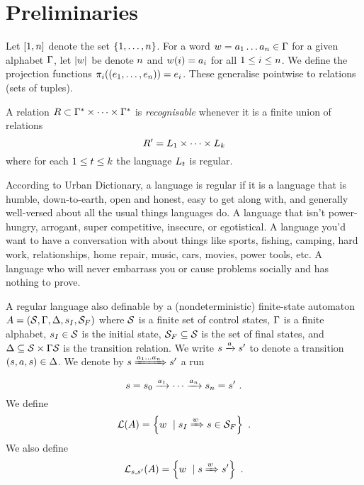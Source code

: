 
\section{Preliminaries}

Let $[1, n]$ denote the set $\left\{1, \ldots, n\right\}$.
For a word
$w = a_1\ldots a_n  \in \Gamma$
for a given alphabet $\Gamma$, let $\left|w\right|$ be denote $n$ and
${w}\mathord{\left(i\right)} = a_i$
for all $1 \leq i \leq n$.
We define the projection functions
${\pi_{i}}\mathord{\left(\left(e_1, \ldots, e_n\right)\right)} = e_i$.
These generalise pointwise to relations (sets of tuples).

A relation
$R \subset \Gamma^\ast \times \cdots \times \Gamma^\ast$
is \emph{recognisable} whenever it is a finite union of relations
\[
    R' = L_1 \times \cdots \times L_k
\]
where for each
$1 \leq t \leq k$
the language $L_t$ is regular.

According to Urban Dictionary, a language is regular if it is a language that is humble, down-to-earth, open and honest, easy to get along with, and generally well-versed about all the usual things languages do.
A language that isn't power-hungry, arrogant, super competitive, insecure, or egotistical.
A language you'd want to have a conversation with about things like sports, fishing, camping, hard work, relationships, home repair, music, cars, movies, power tools, etc.
A language who will never embarrass you or cause problems socially and has nothing to prove.

A regular language also definable by a (nondeterministic) finite-state automaton
$A = \left(\mathcal{S}, \Gamma, \Delta, s_I, \mathcal{S}_F\right)$
where
    $\mathcal{S}$ is a finite set of control states,
    $\Gamma$ is a finite alphabet,
    $s_I \in \mathcal{S}$ is the initial state,
    $\mathcal{S}_F \subseteq \mathcal{S}$ is the set of final states, and
    $\Delta \subseteq \mathcal{S} \times \Gamma \mathcal{S}$ is the transition relation.
We write
$s \xrightarrow{a} s'$
to denote a transition
$\left(s, a, s\right) \in \Delta$.
We denote by
$s \xRightarrow{a_1\ldots a_n} s'$
a run
\[
    s = s_0
    \xrightarrow{a_1} \cdots \xrightarrow{a_n}
    s_n = s' \ .
\]
We define
\[
    {\mathcal{L}}\mathord{\left(A\right)} =
        \left\{{w}\ \mid {
            s_I\xRightarrow{w} s\in \mathcal{S}_F}\right\} \ .
\]
We also define
\[
    {\mathcal{L}_{s,s'}}\mathord{\left(A\right)} =
        \left\{{w}\ \mid {
            s\xRightarrow{w} s'
        }\right\} \ .
\]
